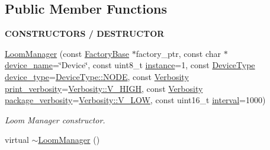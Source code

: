 \subsection*{Public Member Functions}
\begin{Indent}{\bf C\+O\+N\+S\+T\+R\+U\+C\+T\+O\+RS / D\+E\+S\+T\+R\+U\+C\+T\+OR}\par
\begin{DoxyCompactItemize}
\item 
\hyperlink{class_loom_manager_a084222072528d9fe59480b0c9e2f5757}{Loom\+Manager} (const \hyperlink{class_factory_base}{Factory\+Base} $\ast$factory\+\_\+ptr, const char $\ast$\hyperlink{class_loom_manager_aac06e8c17477ab5d8991e782f9ffecca}{device\+\_\+name}=\char`\"{}Device\char`\"{}, const uint8\+\_\+t \hyperlink{class_loom_manager_af2ce718d7f1d10bdd48344acabf47488}{instance}=1, const \hyperlink{class_loom_manager_a23170d165993ad196a7604fd08b29400}{Device\+Type} \hyperlink{class_loom_manager_af280305895cc3b2c5022d4a5fabeb2c4}{device\+\_\+type}=\hyperlink{class_loom_manager_a23170d165993ad196a7604fd08b29400a0cc25b606fe928a0c9a58f7f209c4495}{Device\+Type\+::\+N\+O\+DE}, const \hyperlink{_misc_8h_abf3be10d03894afb391f3a2935e3b313}{Verbosity} \hyperlink{class_loom_manager_a00b6fc4d662e25ea1b88a427909b8a94}{print\+\_\+verbosity}=\hyperlink{_misc_8h_abf3be10d03894afb391f3a2935e3b313a4cec341dae86f2acc17c82c156c82d13}{Verbosity\+::\+V\+\_\+\+H\+I\+GH}, const \hyperlink{_misc_8h_abf3be10d03894afb391f3a2935e3b313}{Verbosity} \hyperlink{class_loom_manager_a7e57c09ed534c554f96c457127294f20}{package\+\_\+verbosity}=\hyperlink{_misc_8h_abf3be10d03894afb391f3a2935e3b313afb734c04a9e5804353ceb79f5d37a169}{Verbosity\+::\+V\+\_\+\+L\+OW}, const uint16\+\_\+t \hyperlink{class_loom_manager_af5742e2169b750d8b4221778e5c9f629}{interval}=1000)
\begin{DoxyCompactList}\small\item\em Loom Manager constructor. \end{DoxyCompactList}\item 
virtual \hyperlink{class_loom_manager_a4dabf340ea6475e6f0ad395e25a56a47}{$\sim$\+Loom\+Manager} ()
\end{DoxyCompactItemize}
\end{Indent}
